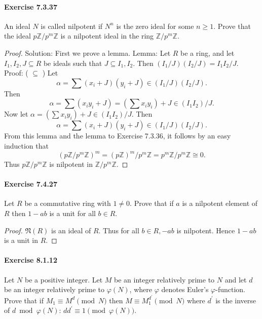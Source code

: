 \documentclass{article}
\theoremstyle{definition}
\begin{document}
\paragraph{Exercise 7.3.37} An ideal $N$ is called nilpotent if $N^{n}$ is the zero ideal for some $n \geq 1$. Prove that the ideal $p \mathbb{Z} / p^{m} \mathbb{Z}$ is a nilpotent ideal in the ring $\mathbb{Z} / p^{m} \mathbb{Z}$.
\begin{proof}
    Solution: First we prove a lemma.
Lemma: Let $R$ be a ring, and let $I_1, I_2, J \subseteq R$ be ideals such that $J \subseteq I_1, I_2$. Then $\left(I_1 / J\right)\left(I_2 / J\right)=I_1 I_2 / J$.
Proof: ( $\subseteq$ ) Let
$$
\alpha=\sum\left(x_i+J\right)\left(y_i+J\right) \in\left(I_1 / J\right)\left(I_2 / J\right) .
$$
Then
$$
\alpha=\sum\left(x_i y_i+J\right)=\left(\sum x_i y_i\right)+J \in\left(I_1 I_2\right) / J .
$$
Now let $\alpha=\left(\sum x_i y_i\right)+J \in\left(I_1 I_2\right) / J$. Then
$$
\alpha=\sum\left(x_i+J\right)\left(y_i+J\right) \in\left(I_1 / J\right)\left(I_2 / J\right) .
$$
From this lemma and the lemma to Exercise 7.3.36, it follows by an easy induction that
$$
\left(p \mathbb{Z} / p^m \mathbb{Z}\right)^m=(p \mathbb{Z})^m / p^m \mathbb{Z}=p^m \mathbb{Z} / p^m \mathbb{Z} \cong 0 .
$$
Thus $p \mathbb{Z} / p^m \mathbb{Z}$ is nilpotent in $\mathbb{Z} / p^m \mathbb{Z}$.
\end{proof}


\paragraph{Exercise 7.4.27} Let $R$ be a commutative ring with $1 \neq 0$. Prove that if $a$ is a nilpotent element of $R$ then $1-a b$ is a unit for all $b \in R$.
\begin{proof}
    $\mathfrak{N}(R)$ is an ideal of $R$. Thus for all $b \in R,-a b$ is nilpotent. Hence $1-a b$ is a unit in $R$.
\end{proof}


\paragraph{Exercise 8.1.12} Let $N$ be a positive integer. Let $M$ be an integer relatively prime to $N$ and let $d$ be an integer relatively prime to $\varphi(N)$, where $\varphi$ denotes Euler's $\varphi$-function. Prove that if $M_{1} \equiv M^{d} \pmod N$ then $M \equiv M_{1}^{d^{\prime}} \pmod N$ where $d^{\prime}$ is the inverse of $d \bmod \varphi(N)$: $d d^{\prime} \equiv 1 \pmod {\varphi(N)}$.
\end{document}
